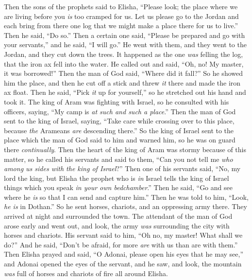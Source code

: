 \begin{biblechapter} %
 Then the sons of the prophets said to Elisha, “Please look; the place where we are living before you \textit{is} too cramped for us.
\verse Let us please go to the Jordan and each bring from there one log that we might make a place there for us to live.” Then he said, “Do so.”
\verse Then a certain one said, “Please be prepared and go with your servants,” and he said, “I will go.”
\verse He went with them, and they went to the Jordan, and they cut down the trees.
\verse It happened as the one \textit{was} felling the log, that the iron ax fell into the water. He called out and said, “Oh, no! My master, it was borrowed!”
\verse Then the man of God said, “Where did it fall?” So he showed him the place, and then he cut off a stick and threw \textit{it} there and made the iron ax float.
\verse Then he said, “Pick \textit{it} up for yourself,” so he stretched out his hand and took it.
 The king of Aram was fighting with Israel, so he consulted with his officers, saying, “My camp is \textit{at such and such a place}.”
\verse Then the man of God sent to the king of Israel, saying, “Take care while crossing over to this place, because \textit{the} Arameans \textit{are} descending there.”
\verse So the king of Israel sent to the place which the man of God said to him and warned him, so he was on guard there \textit{continually}.
\verse Then the heart of the king of Aram was stormy because of this matter, so he called his servants and said to them, “Can you not tell me \textit{who among us sides with the king of Israel}?”
\verse Then one of his servants said, “No, my lord the king, but Elisha the prophet who is \textit{in} Israel tells the king of Israel things which you speak \textit{in your own bedchamber}.”
\verse Then he said, “Go and see where he \textit{is} so that I can send and capture him.” Then he was told to him, “Look, \textit{he is} in Dothan.”
\verse So he sent horses, chariots, and an oppressing army there. They arrived at night and surrounded the town.
\verse The attendant of the man of God arose early and went out, and look, the army \textit{was} surrounding the city with horses and chariots. His servant said to him, “Oh no, my master! What shall we do?”
\verse And he said, “Don’t be afraid, for more \textit{are} with us than are with them.”
\verse Then Elisha prayed and said, “O Adonai, please open his eyes that he may see,” and Adonai opened the eyes of the servant, and he saw, and look, the mountain \textit{was} full of horses and chariots of fire all around Elisha.

\end{biblechapter}
